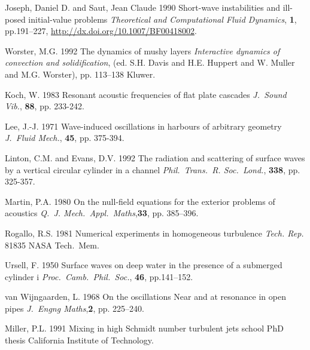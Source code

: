 \documentclass[lineno]{JFM-FLM_Au}
\begin{document}
\begin{thebibliography}{}
 {\sc Joseph, Daniel D. and Saut, Jean Claude} 1990 Short-wave instabilities and ill-posed initial-value problems {\it Theoretical and Computational Fluid Dynamics}, {\bf 1},  pp.191--227,  {\url{http://dx.doi.org/10.1007/BF00418002}}.

{ \sc  Worster, M.G.} 1992 The dynamics of mushy layers {\it Interactive dynamics of convection and solidification},
{(ed. S.H. Davis and H.E. Huppert and W. Muller and M.G. Worster)}, pp. 113--138 {Kluwer}.

{\sc Koch, W.} 1983 Resonant acoustic frequencies of flat plate cascades {\it J.~Sound Vib.}, {\bf 88}, pp. 233-242.

{\sc Lee,  J.-J.}  1971 Wave-induced oscillations in harbours of arbitrary geometry {\it J.~Fluid Mech.}, {\bf 45}, pp. 375-394.

 {\sc  Linton, C.M. and  Evans, D.V.} 1992 The radiation and scattering of surface waves by a vertical circular cylinder in a channel {\it Phil.\ Trans.\ R. Soc.\ Lond.}, {\bf 338}, pp. 325-357.

 {\sc  Martin, P.A.} 1980 On the null-field equations for the exterior problems of acoustics {\it Q.~J. Mech.\ Appl.\ Maths},{\bf 33}, pp. 385--396.

 {\sc Rogallo,  R.S.} 1981 Numerical experiments in homogeneous turbulence  { {\it Tech. Rep.} 81835}  {NASA Tech.\ Mem}.

{\sc  Ursell, F.} 1950 Surface waves on deep water in the presence of a submerged cylinder i {\it Proc.\ Camb.\ Phil.\ Soc.}, {\bf 46}, pp.141--152.

{\sc van Wijngaarden, L.} 1968 On the oscillations Near and at resonance in open pipes {\it J.~Engng Maths},{\bf 2}, pp. 225--240.

{ \sc  Miller, P.L.} 1991 Mixing in high Schmidt number turbulent jets {school {PhD thesis}} {California Institute of Technology}.

\end{thebibliography}

\end{document}
